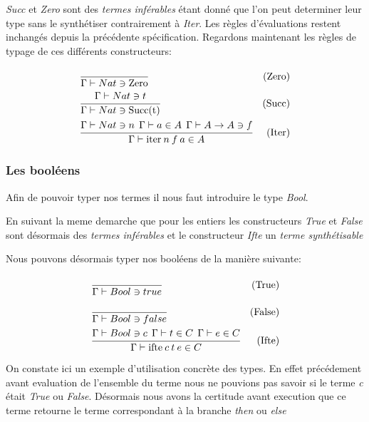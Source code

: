 \documentclass {article}
\theoremstyle{definition}
\theoremstyle{remark}
\begin{document}
\emph{Succ} et \emph{Zero} sont des \emph{termes inférables} étant donné que l'on peut determiner leur 
type sans le synthétiser contrairement à \emph{Iter}.
Les règles d'évaluations restent inchangés depuis la précédente spécification.
Regardons maintenant les règles de typage de ces différents constructeurs:
\begin{align*}
  &\cfrac{\:}
  {\Gamma\vdash Nat \ni \mathrm{Zero}}&\mbox{(Zero)} \\
  &\cfrac{\Gamma\vdash Nat \ni t}
  {\Gamma\vdash Nat \ni \mathrm{Succ(t)}}&\mbox{(Succ)} \\
  &\cfrac{\Gamma\vdash Nat \ni n \:\: \Gamma\vdash a \in A \:\: \Gamma\vdash A\rightarrow A \ni f}
  {\Gamma\vdash \mathrm{iter}\: n\: f\: a \in A}&\mbox{(Iter)} \\
\end{align*}


\subsubsection{Les booléens}

Afin de pouvoir typer nos termes il nous faut introduire le type \emph{Bool}.


En suivant la meme demarche que  pour les entiers les 
constructeurs \emph{True} et \emph{False} sont désormais des \emph{termes inférables}
et le constructeur \emph{Ifte} un \emph{terme synthétisable}



Nous pouvons désormais typer nos booléens de la manière suivante:
\begin{align*}
  &\cfrac{}
  {\Gamma\vdash Bool \ni true}&\mbox{(True)} \\
  &\cfrac{}
  {\Gamma\vdash Bool \ni false}&\mbox{(False)} \\
  &\cfrac{\Gamma\vdash Bool \ni c \:\: \Gamma\vdash t \in C \:\: \Gamma\vdash e \in C}
  {\Gamma\vdash \mathrm{ifte}\: c\: t\: e\in C}&\mbox{(Ifte)}
\end{align*}

On constate ici un exemple d'utilisation concrète des types. En effet 
précédement avant evaluation de l'ensemble du terme nous ne pouvions 
pas savoir si le terme \emph{c} était \emph{True} ou \emph{False}.
Désormais nous avons la certitude avant execution que ce terme retourne 
le terme correspondant à la branche \emph{then} ou \emph{else}
\end{document}

